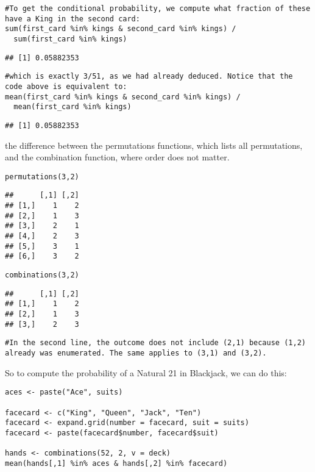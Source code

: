 \documentclass[
]{article}
\begin{document}
\begin{verbatim}
#To get the conditional probability, we compute what fraction of these have a King in the second card:
sum(first_card %in% kings & second_card %in% kings) /
  sum(first_card %in% kings)
\end{verbatim}

\begin{verbatim}
## [1] 0.05882353
\end{verbatim}

\begin{verbatim}
#which is exactly 3/51, as we had already deduced. Notice that the code above is equivalent to:
mean(first_card %in% kings & second_card %in% kings) /
  mean(first_card %in% kings)
\end{verbatim}

\begin{verbatim}
## [1] 0.05882353
\end{verbatim}

the difference between the permutations functions, which lists all
permutations, and the combination function, where order does not matter.

\begin{verbatim}
permutations(3,2)
\end{verbatim}

\begin{verbatim}
##      [,1] [,2]
## [1,]    1    2
## [2,]    1    3
## [3,]    2    1
## [4,]    2    3
## [5,]    3    1
## [6,]    3    2
\end{verbatim}

\begin{verbatim}
combinations(3,2)
\end{verbatim}

\begin{verbatim}
##      [,1] [,2]
## [1,]    1    2
## [2,]    1    3
## [3,]    2    3
\end{verbatim}

\begin{verbatim}
#In the second line, the outcome does not include (2,1) because (1,2) already was enumerated. The same applies to (3,1) and (3,2).
\end{verbatim}

So to compute the probability of a Natural 21 in Blackjack, we can do
this:

\begin{verbatim}
aces <- paste("Ace", suits)

facecard <- c("King", "Queen", "Jack", "Ten")
facecard <- expand.grid(number = facecard, suit = suits)
facecard <- paste(facecard$number, facecard$suit)

hands <- combinations(52, 2, v = deck)
mean(hands[,1] %in% aces & hands[,2] %in% facecard)
\end{verbatim}
\end{document}
